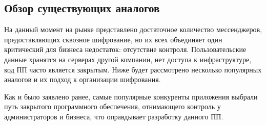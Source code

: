 \subsection{Обзор существующих аналогов}
\label{sec:analysis:research:analogs}

На данный момент на рынке представлено достаточное количество мессенджеров, предоставляющих сквозное шифрование, но их всех объединяет один критический для бизнеса недостаток: отсутствие контроля. 
Пользовательские данные хранятся на серверах другой компании, нет доступа к инфраструктуре, код ПП часто является закрытым. Ниже будет рассмотрено несколько популярных аналогов и их подход к организации шифрования.




Как и было заявлено ранее, самые популярные конкуренты приложения выбрали путь закрытого программного обеспечения, отнимающего контроль у администраторов и бизнеса, что оправдывает разработку данного ПП.